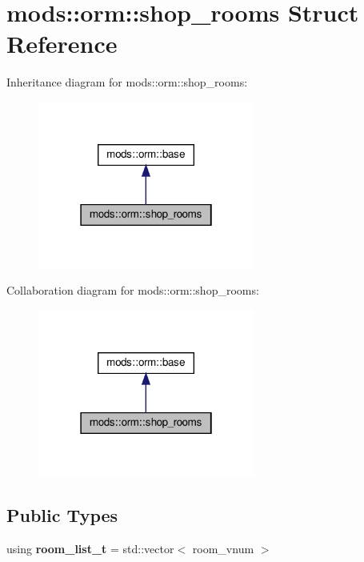 \hypertarget{structmods_1_1orm_1_1shop__rooms}{}\section{mods\+:\+:orm\+:\+:shop\+\_\+rooms Struct Reference}
\label{structmods_1_1orm_1_1shop__rooms}


Inheritance diagram for mods\+:\+:orm\+:\+:shop\+\_\+rooms\+:
\nopagebreak
\begin{figure}[H]
\begin{center}
\leavevmode
\includegraphics[width=202pt]{structmods_1_1orm_1_1shop__rooms__inherit__graph}
\end{center}
\end{figure}


Collaboration diagram for mods\+:\+:orm\+:\+:shop\+\_\+rooms\+:
\nopagebreak
\begin{figure}[H]
\begin{center}
\leavevmode
\includegraphics[width=202pt]{structmods_1_1orm_1_1shop__rooms__coll__graph}
\end{center}
\end{figure}
\subsection*{Public Types}
\begin{DoxyCompactItemize}
\item 
\mbox{\label{structmods_1_1orm_1_1shop__rooms_a2f9ceb086bcc4956f88938f859fc967f}} 
using {\bfseries room\+\_\+list\+\_\+t} = std\+::vector$<$ room\+\_\+vnum $>$
\end{DoxyCompactItemize}

